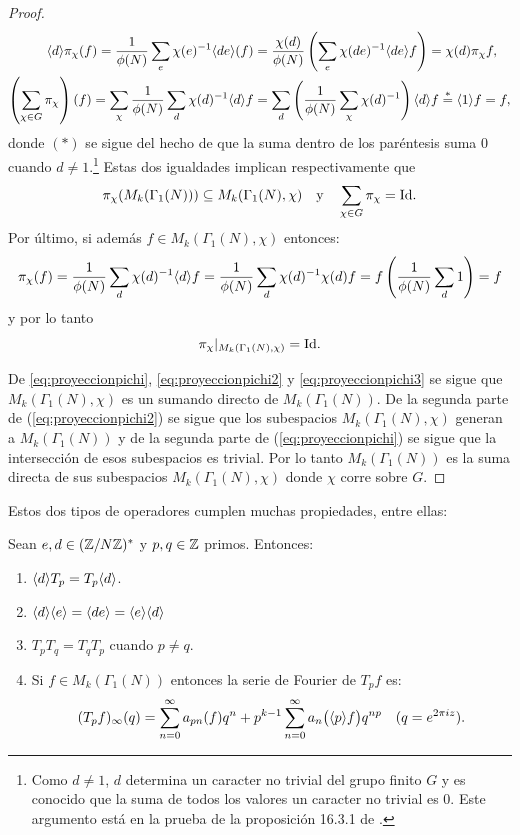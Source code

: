 \documentclass[../../tesis_maestria]{subfiles}
\begin{document}
\begin{proof}
\begin{align*}
    \langle d \rangle\pi_{\chi}(f)=\frac{1}{\phi(N)}\sum_e\chi(e)^{-1}\langle de \rangle(f)
    &=\frac{\chi(d)}{\phi(N)}\left( \sum_e\chi(de)^{-1}\langle de \rangle f \right)=\chi(d)\pi_{\chi}f,\\
    \left( \sum_{\chi\in G}\pi_{\chi} \right)(f)=\sum_{\chi}\frac{1}{\phi(N)}\sum_d\chi(d)^{-1}\langle d \rangle f
    &=\sum_d\left( \frac{1}{\phi(N)}\sum_{\chi}\chi(d)^{-1} \right)\langle d \rangle f\overset{*}{=}\langle 1 \rangle f=f,
  \end{align*}
  donde $(*)$ se sigue del hecho de que la suma dentro de los par\'entesis suma 0 cuando $d\neq1$.\footnote{Como
    $d\neq1$, $d$ determina un caracter no trivial del grupo finito $G$ y es conocido que la suma de todos los
    valores un caracter no trivial es 0. Este argumento est\'a en la prueba de la proposici\'on 16.3.1 de
    \cite{IrelandRosenACITMNT}.}
  Estas dos igualdades implican respectivamente que
  \begin{equation}
    \label{eq:proyeccionpichi2}
    \pi_{\chi}(M_k(\Gamma_1(N)))\subseteq M_k(\Gamma_1(N),\chi) \quad\text{y}\quad
    \sum_{\chi\in G}\pi_{\chi}=\mathrm{Id}.
  \end{equation}
  Por \'ultimo, si adem\'as $f\in M_k(\Gamma_1(N),\chi)$ entonces:
  \[
    \pi_{\chi}(f)=\frac{1}{\phi(N)}\sum_d\chi(d)^{-1}\langle d \rangle f=
    \frac{1}{\phi(N)}\sum_d\chi(d)^{-1}\chi(d)f=f\left( \frac{1}{\phi(N)}\sum_d1 \right)=f
  \]
  y por lo tanto
  \begin{equation}\label{eq:proyeccionpichi3}
    \pi_{\chi}|_{M_{k}(\Gamma_1(N),\chi)}=\mathrm{Id}.
  \end{equation}

  De \eqref{eq:proyeccionpichi}, \eqref{eq:proyeccionpichi2}  y \eqref{eq:proyeccionpichi3} se sigue
  que $M_k(\Gamma_1(N),\chi)$ es un sumando directo de $M_k(\Gamma_1(N))$. De la segunda parte de
  (\ref{eq:proyeccionpichi2}) se sigue que los subespacios $M_k(\Gamma_1(N),\chi)$ generan a
  $M_k(\Gamma_1(N))$ y de la segunda parte de (\ref{eq:proyeccionpichi}) se sigue que la
  intersecci\'on de esos subespacios es trivial. Por lo tanto $M_k(\Gamma_1(N))$ es la suma directa
  de sus subespacios $M_k(\Gamma_1(N),\chi)$ donde $\chi$ corre sobre $G$.
\end{proof}

Estos dos tipos de operadores cumplen muchas propiedades, entre ellas:

\begin{prop}\label{prop:opdeHecke} Sean $e,d\in(\mathbb{Z}/N\mathbb{Z})^*$ y $p,q\in\mathbb{Z}$ primos. Entonces:
  \begin{enumerate}[label=\roman*)]
  \item $\langle d \rangle T_p=T_p\langle d \rangle$.
  \item $\langle d \rangle\langle e \rangle=\langle de \rangle=\langle e \rangle\langle d \rangle$
  \item $T_pT_q=T_qT_p$ cuando $p\neq q$.
  \item\label{prop:FourieropdeHecke} Si $f\in M_k(\Gamma_1(N))$ entonces la serie de
    Fourier de $T_pf$ es:
    \[
      (T_pf)_{\infty}(q)=
      \sum_{n=0}^{\infty}a_{pn}(f)q^n+p^{k-1}\sum_{n=0}^{\infty}a_n\big(\langle p \rangle f\big)q^{np}\quad
      (q=e^{2\pi i z}).
    \]
  \end{enumerate}
\end{prop}
\end{document}
